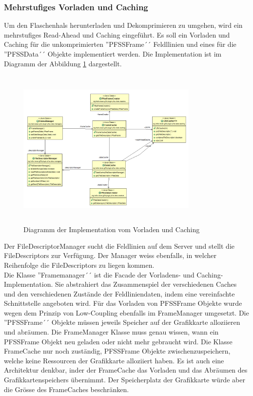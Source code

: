 \subsubsection{Mehrstufiges Vorladen und Caching}
Um den Flaschenhals herunterladen und Dekomprimieren zu umgehen, wird ein mehrstufiges Read-Ahead und Caching eingeführt. Es soll ein Vorladen und Caching für die unkomprimierten ''PFSSFrame´´ Feldllinien und eines für die ''PFSSData´´ Objekte implementiert werden. Die Implementation ist im Diagramm der Abbildung \ref{implementation:architektur:caching} dargestellt.
\begin{figure}[!htbp]
	\center
	\includegraphics[width=0.8\textwidth,height=8cm,keepaspectratio]{./pictures/implementation/architectureCache.png}
	\caption{Diagramm der Implementation vom Vorladen und Caching}
	\label{implementation:architektur:caching}
\end{figure}
Der FileDescriptorManager sucht die Feldlinien auf dem Server und stellt die FileDescriptors zur Verfügung. Der Manager weiss ebenfalls, in welcher Reihenfolge die FileDescriptors zu liegen kommen.\\
Die Klasse ''Framemanager´´ ist die Facade der Vorladens- und Caching- Implementation. Sie abstrahiert das Zusammenspiel der verschiedenen Caches und den verschiedenen Zustände der Feldliniendaten, indem eine vereinfachte Schnittstelle angeboten wird. Für das Vorladen von PFSSFrame Objekte wurde wegen dem Prinzip von Low-Coupling ebenfalls im FrameManager umgesetzt. Die ''PFSSFrame´´ Objekte müssen jeweils Speicher auf der Grafikkarte alloziieren und abräumen. Die FrameManager Klasse muss genau wissen, wann ein PFSSFrame Objekt neu geladen oder nicht mehr gebraucht wird. Die Klasse FrameCache nur noch zuständig, PFSSFrame Objekte zwischenzuspeichern, welche keine Ressourcen der Grafikkarte alloziiert haben. Es ist auch eine Architektur denkbar, inder der FrameCache das Vorladen und das Abräumen des Grafikkartenspeichers übernimmt. Der Speicherplatz der Grafikkarte würde aber die Grösse des FrameCaches beschränken.\\
